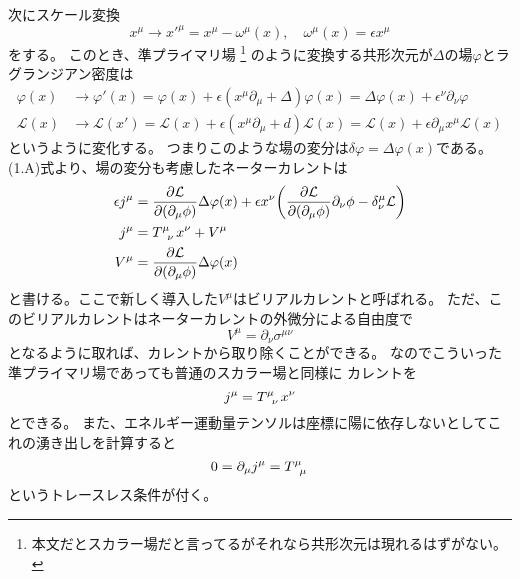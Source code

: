 \documentclass[../../master.tex]{subfiles}
\begin{document}
次にスケール変換
\begin{equation}
    x^\mu \rightarrow x'^\mu = x^\mu -\omega^\mu(x), \quad \omega^\mu(x) = \epsilon x^\mu
\end{equation}
をする。
このとき、準プライマリ場
\footnote{本文だとスカラー場だと言ってるがそれなら共形次元は現れるはずがない。}
のように変換する共形次元が\(\Delta\)の場\(\varphi\)とラグランジアン密度は
\begin{align}
    \varphi(x)&\rightarrow \varphi'(x)
    =\varphi(x) + \epsilon(x^\mu\partial_\mu+\Delta)\varphi(x)
    = \Delta \varphi(x) + \epsilon^\nu \partial_\nu \varphi\\
    \mathcal{L}(x) &\rightarrow \mathcal{L}(x')
    = \mathcal{L}(x) + \epsilon(x^\mu\partial_\mu + d)\mathcal{L}(x)
    = \mathcal{L}(x) + \epsilon \partial_\mu x^\mu \mathcal{L}(x)
\end{align}
というように変化する。
つまりこのような場の変分は\(\delta\varphi = \Delta\varphi(x)\)である。
(1.A)式より、場の変分も考慮したネーターカレントは
\begin{align}
    \epsilon j^\mu &= \pdv{\mathcal{L}}{(\partial_\mu \phi)}\Delta\varphi(x)
    + \epsilon x^\nu\qty(\pdv{\mathcal{L}}{(\partial_\mu \phi)}\partial_\nu \phi - \delta_\nu^\mu\mathcal{L})\notag\\
    j^\mu &= T\indices{^\mu_\nu}x^\nu + V^\mu\\
    V^\mu &= \pdv{\mathcal{L}}{(\partial_\mu \phi)}\Delta\varphi(x)
\end{align}
と書ける。ここで新しく導入した\(V^\mu\)はビリアルカレントと呼ばれる。
ただ、このビリアルカレントはネーターカレントの外微分による自由度で
\begin{equation}
    V^\mu = \partial_\nu \sigma^{\mu\nu}
\end{equation}
となるように取れば、カレントから取り除くことができる。
なのでこういった準プライマリ場であっても普通のスカラー場と同様に
カレントを
\begin{equation}
    j^\mu = T\indices{^\mu_\nu}x^\nu
\end{equation}
とできる。
また、エネルギー運動量テンソルは座標に陽に依存しないとしてこれの湧き出しを計算すると
\begin{equation}
    0 = \partial_\mu j^\mu = T\indices{^\mu_\mu}
\end{equation}
というトレースレス条件が付く。
\end{document}
